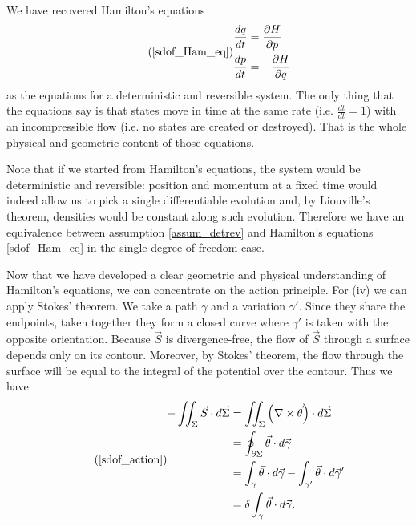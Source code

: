 \documentclass[fleqn,10pt]{wlscirep}
\begin{document}
We have recovered Hamilton's equations
\begin{equation}
\tag*{(\ref{sdof_Ham_eq})}
\begin{aligned}
	\frac{dq}{dt} &= \frac{\partial H}{\partial p} \\
	\frac{dp}{dt} &=-\frac{\partial H}{\partial q}
\end{aligned}
\end{equation}
as the equations for a deterministic and reversible system. The only thing that the equations say is that states move in time at the same rate (i.e. $\frac{dt}{dt} = 1$) with an incompressible flow (i.e. no states are created or destroyed). That is the whole physical and geometric content of those equations.

Note that if we started from Hamilton's equations, the system would be deterministic and reversible: position and momentum at a fixed time would indeed allow us to pick a single differentiable evolution and, by Liouville's theorem, densities would be constant along such evolution. Therefore we have an equivalence between assumption \ref{assum_detrev} and Hamilton's equations \ref{sdof_Ham_eq} in the single degree of freedom case.

Now that we have developed a clear geometric and physical understanding of Hamilton's equations, we can concentrate on the action principle. For (iv) we can apply Stokes' theorem. We take a path $\gamma$ and a variation $\gamma'$. Since they share the endpoints, taken together they form a closed curve where $\gamma'$ is taken with the opposite orientation. Because $\vec{S}$ is divergence-free, the flow of $\vec{S}$ through a surface depends only on its contour. Moreover, by Stokes' theorem, the flow through the surface will be equal to the integral of the potential over the contour. Thus we have
\begin{equation}
\tag*{(\ref{sdof_action})}
\begin{aligned}
	- \iint_{\Sigma} \vec{S} \cdot d\vec{\Sigma} &=
	\iint_{\Sigma} \left( \nabla \times \vec{\theta} \right) \cdot d\vec{\Sigma} \\
	&= \oint_{\partial \Sigma} \vec{\theta}  \cdot d\vec{\gamma} \\
	&= \int_{\gamma} \vec{\theta} \cdot d\vec{\gamma} - \int_{\gamma'} \vec{\theta} \cdot d\vec{\gamma}' \\
	&= \delta \int_{\gamma} \vec{\theta} \cdot d\vec{\gamma}.
\end{aligned}
\end{equation}
\end{document}
